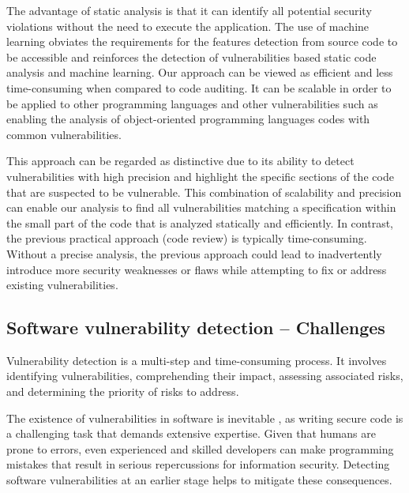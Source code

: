 The advantage of static analysis is that it can identify all potential security violations without the need to execute the application. The use of machine learning obviates the requirements for the features detection from source code to be accessible and reinforces the detection of vulnerabilities based static code analysis and machine learning. Our approach can be viewed as efficient and less time-consuming when compared to code auditing. It can be scalable in order to be applied to other programming languages and other vulnerabilities such as enabling the analysis of object-oriented programming languages codes with common vulnerabilities.

This approach can be regarded as distinctive due to its ability to detect vulnerabilities with high precision and highlight the specific sections of the code that are suspected to be vulnerable. This combination of scalability and precision can enable our analysis to find all vulnerabilities matching a specification within the small part of the code that is analyzed statically and efficiently. In contrast, the previous practical approach (code review) is typically time-consuming. Without a precise analysis, the previous approach could lead to inadvertently introduce more security weaknesses or flaws while attempting to fix or address existing vulnerabilities.


\subsection{ Software vulnerability detection -- Challenges 
} %
\label{sub:challenges_of_detecting_vulnerabilities}

Vulnerability detection is a multi-step and time-consuming process. It involves identifying vulnerabilities, comprehending their impact, assessing associated risks, and determining the priority of risks to address.

The existence of vulnerabilities in software is inevitable \cite{MOHAMMED_MUSTAPHA_MAMDOUH}, as writing secure code is a challenging task that demands extensive expertise. Given that humans are prone to errors, even experienced and skilled developers can make programming mistakes that result in serious repercussions for information security. Detecting software vulnerabilities at an earlier stage helps to mitigate these consequences. 

